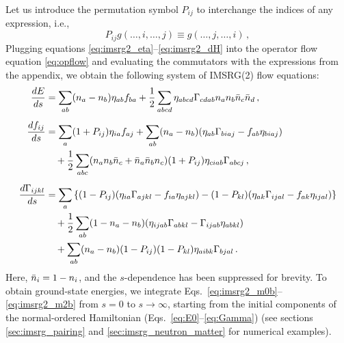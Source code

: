 {Let us introduce the permutation symbol $P_{ij}$ to interchange the 
indices of any expression, i.e.,
\begin{equation}\label{eq:def_Pij}
  P_{ij} g(\ldots,i,\ldots,j) \equiv g(\ldots,j,\ldots,i)\,,
\end{equation}
Plugging equations \eqref{eq:imsrg2_eta}--\eqref{eq:imsrg2_dH} into 
the operator flow equation \eqref{eq:opflow} and evaluating the 
commutators with the expressions from the appendix, we obtain the 
following system of IMSRG(2) flow equations:
\begin{align}
  \totd{E}{s}&= \sum_{ab}(n_a-n_b)\eta_{ab} f_{ba} 
    + \frac{1}{2} \sum_{abcd}\eta_{abcd}\Gamma_{cdab} n_a n_b\bar{n}_c\bar{n}_d
    \label{eq:imsrg2_m0b}\,,\\[5pt]
% 
  \totd{f_{ij}}{s} &= 
  \sum_{a}(1+P_{ij})\eta_{ia}f_{aj} +\sum_{ab}(n_a-n_b)(\eta_{ab}\Gamma_{biaj}-f_{ab}\eta_{biaj}) \notag\\ 
  &\quad +\frac{1}{2}\sum_{abc}(n_an_b\bar{n}_c+\bar{n}_a\bar{n}_bn_c) (1+P_{ij})\eta_{ciab}\Gamma_{abcj}
  \label{eq:imsrg2_m1b}\,,\\[5pt]
% 
  \totd{\Gamma_{ijkl}}{s}&= 
  \sum_{a}\left\{ 
    (1-P_{ij})(\eta_{ia}\Gamma_{ajkl}-f_{ia}\eta_{ajkl} )
    -(1-P_{kl})(\eta_{ak}\Gamma_{ijal}-f_{ak}\eta_{ijal} )
    \right\}\notag \\
  &\quad+ \frac{1}{2}\sum_{ab}(1-n_a-n_b)(\eta_{ijab}\Gamma_{abkl}-\Gamma_{ijab}\eta_{abkl})
    \notag\\
  &\quad+\sum_{ab}(n_a-n_b) (1-P_{ij})(1-P_{kl})\eta_{aibk}\Gamma_{bjal}
    \label{eq:imsrg2_m2b}\,.
\end{align}
Here, $\bar{n}_i=1-n_i$, and the $s$-dependence has been suppressed for brevity. 
To obtain ground-state energies, we integrate Eqs.~\eqref{eq:imsrg2_m0b}--\eqref{eq:imsrg2_m2b} 
from $s=0$ to $s\to\infty$, starting from the initial components of the 
normal-ordered Hamiltonian (Eqs.~\eqref{eq:E0}--\eqref{eq:Gamma})
(see sections \ref{sec:imsrg_pairing} and \ref{sec:imsrg_neutron_matter} 
for numerical examples).

}
